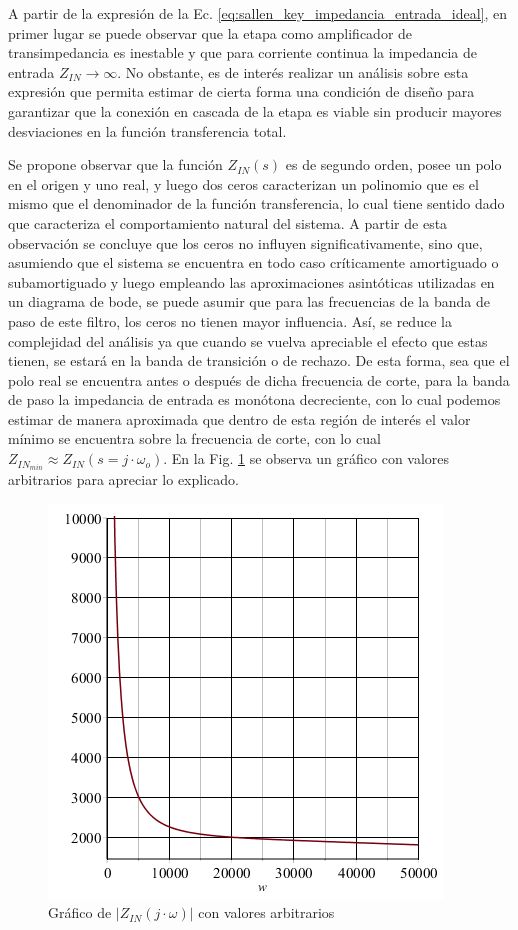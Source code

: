 A partir de la expresi\'on de la Ec. \ref{eq:sallen_key_impedancia_entrada_ideal}, en primer lugar se puede observar que la etapa como amplificador de transimpedancia es inestable y que para corriente continua la impedancia de entrada $Z_{IN} \rightarrow \infty$.
No obstante, es de inter\'es realizar un an\'alisis sobre esta expresi\'on que permita estimar de cierta forma una condici\'on de dise\~no para garantizar que la conexi\'on en cascada de la etapa es viable sin producir mayores desviaciones en la funci\'on transferencia total.

Se propone observar que la funci\'on $Z_{IN}(s)$ es de segundo orden, posee un polo en el origen y uno real, y luego dos ceros caracterizan un polinomio que es el mismo que el denominador de la funci\'on transferencia, lo cual tiene sentido
dado que caracteriza el comportamiento natural del sistema. A partir de esta observaci\'on se concluye que los ceros no influyen significativamente, sino que, asumiendo que el sistema se encuentra en todo caso cr\'iticamente amortiguado o subamortiguado y luego empleando las aproximaciones asint\'oticas
utilizadas en un diagrama de bode, se puede asumir que para las frecuencias de la banda de paso de este filtro, los ceros no tienen mayor influencia. As\'i, se reduce la complejidad del an\'alisis ya que cuando se vuelva apreciable el efecto que estas tienen, se estar\'a en la banda de transici\'on o de rechazo.
De esta forma, sea que el polo real se encuentra antes o despu\'es de dicha frecuencia de corte, para la banda de paso la impedancia de entrada es mon\'otona decreciente, con lo cual podemos estimar de manera aproximada que dentro de esta regi\'on de inter\'es el valor m\'inimo se encuentra sobre la frecuencia de corte,
con lo cual $Z_{IN_{min}} \approx Z_{IN}(s=j \cdot \omega_o)$. En la Fig. \ref{fig:grafico_zin_ideal_arbitraria} se observa un gr\'afico con valores arbitrarios para apreciar lo explicado.

\begin{figure}[H]
    \centering
    \includegraphics[scale=0.6]{../EJ1/Recursos/impedancia_entrada_arbitraria.png}
    \caption{Gr\'afico de $|Z_{IN}(j \cdot \omega)|$ con valores arbitrarios}
    \label{fig:grafico_zin_ideal_arbitraria}
\end{figure}

